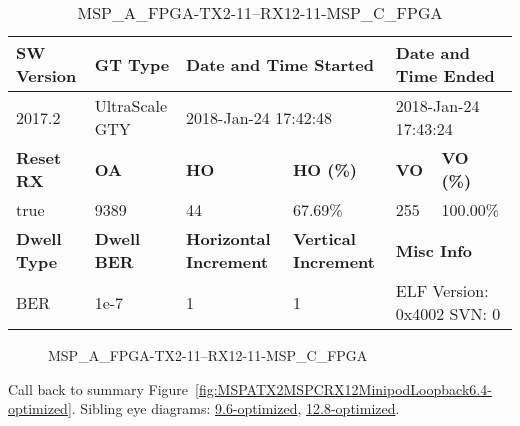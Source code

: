 \begin{table}[h]
\centering
\caption{MSP\_A\_FPGA-TX2-11--RX12-11-MSP\_C\_FPGA}
\label{tab:MSPAFPGATX211RX1211MSPCFPGA6.4-optimized}
\begin{tabular}{@{}|l|l|l|l|l|l|@{}}
\toprule
\textbf{SW Version}                & \textbf{GT Type}   & \multicolumn{2}{l|}{\textbf{Date and Time Started}}            & \multicolumn{2}{l|}{\textbf{Date and Time Ended}}        \\ \midrule
2017.2                       & UltraScale GTY          & \multicolumn{2}{l|}{2018-Jan-24 17:42:48}                   & \multicolumn{2}{l|}{2018-Jan-24 17:43:24}               \\ \midrule
\textbf{Reset RX}                  & \textbf{OA} & \textbf{HO}   & \textbf{HO (\%)} & \textbf{VO} & \textbf{VO (\%)} \\ \midrule
true & 9389        & 44          & 67.69\%        & 255        & 100.00\%       \\ \midrule
\textbf{Dwell Type}                & \textbf{Dwell BER} & \textbf{Horizontal Increment} & \textbf{Vertical Increment}    & \multicolumn{2}{l|}{\textbf{Misc Info}}                  \\ \midrule
BER                            & 1e-7        & 1        & 1           & \multicolumn{2}{l|}{ELF Version: 0x4002 SVN: 0}                         \\ \bottomrule
\end{tabular}
\end{table}

\begin{figure}[h]
\caption{MSP\_A\_FPGA-TX2-11--RX12-11-MSP\_C\_FPGA} \label{fig:MSPAFPGATX211RX1211MSPCFPGA6.4-optimized}
\end{figure}

Call back to summary Figure~\ref{fig:MSPATX2MSPCRX12MinipodLoopback6.4-optimized}.
Sibling eye diagrams: \hyperref[sec:MSPAFPGATX211RX1211MSPCFPGA9.6-optimized]{9.6-optimized}, \hyperref[sec:MSPAFPGATX211RX1211MSPCFPGA12.8-optimized]{12.8-optimized}.

\clearpage
\newpage

